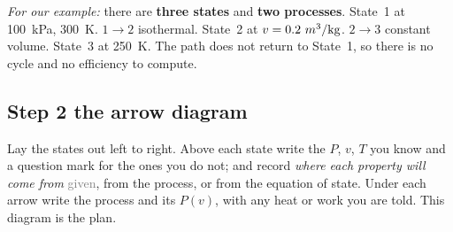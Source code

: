 \documentclass[11pt,a4paper]{article}
\newcommand{\stinfo}[1]{\textcolor{stateblue}{#1}}
\newcommand{\prinfo}[1]{\textcolor{procred}{#1}}
\newcommand{\Dg}[1]{$#1$\,{\scriptsize\textcolor{gray}{(given)}}}
\newcommand{\Dp}[1]{\textcolor{procred}{$#1$\,{\scriptsize(process)}}}
\newcommand{\De}[1]{\textcolor{stateblue}{$#1$\,{\scriptsize(EoS)}}}
\newcommand{\mcube}{{m\textsuperscript{3}}}
\newcommand{\cv}{c_{v}}
\begin{document}
\emph{For our example:} there are \textbf{three states} and \textbf{two
processes}. \stinfo{State~1 at 100~kPa, 300~K.} \prinfo{$1\!\to\!2$ isothermal.}
\stinfo{State~2 at $v = 0.2~\mcube/\text{kg}$.} \prinfo{$2\!\to\!3$ constant
volume.} \stinfo{State~3 at 250~K.} The path does not return to State~1, so there
is no cycle and no efficiency to compute.

\subsection*{Step 2 \textemdash{} the arrow diagram}

Lay the states out left to right. Above each state write the $P$, $v$, $T$ you
know and a question mark for the ones you do not; and record \emph{where each
property will come from} \textemdash{} \textcolor{gray}{given}, from the
\textcolor{procred}{process}, or from the \textcolor{stateblue}{equation of
state}. Under each arrow write the process and its $P(v)$, with any heat or work
you are told. This diagram is the plan.

\begin{center}
\end{center}
\end{document}
